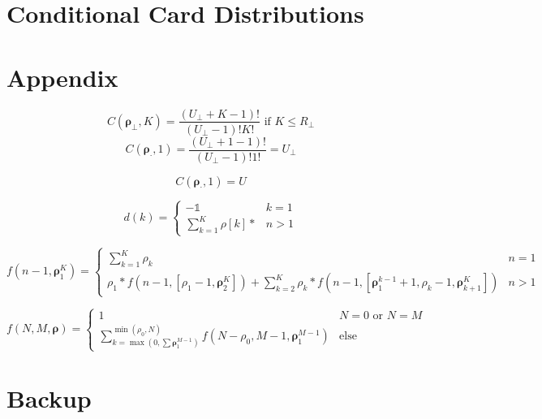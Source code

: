 \documentclass{article}
\begin{document}
\section{Conditional Card Distributions}

\pagebreak

\section{Appendix}

\begin{equation}
    C(\bm{\rho_{\bot}}, K) = \frac{(U_{\bot} + K - 1)!}{(U_{\bot} - 1)!K!} \text{ if } K \leq R_{\bot}
\end{equation}
\begin{equation}
    C(\bm{\rho_{\cdot}}, 1) = \frac{(U_{\bot} + 1 - 1)!}{(U_{\bot} - 1)!1!} = U_{\bot}
\end{equation}

\begin{equation}
    C(\bm{\rho_{\cdot}}, 1) = U
\end{equation}


\begin{equation}
    d(k) = \begin{cases} 
      -\mathds{1} & k=1 \\
      \sum_{k=1}^K \rho[k]* & n>1
   \end{cases}
\end{equation}

\begin{equation}
    f(n-1, \bm{\rho}_1^K) = \begin{cases} 
      \sum_{k=1}^K \rho_k & n=1 \\
      \rho_1*f(n - 1, [\rho_1 - 1, \bm{\rho}_2^K]) + \sum_{k=2}^K \rho_k*f(n - 1, [\bm{\rho}_1^{k-1} + 1, \rho_k - 1, \bm{\rho}_{k+1}^K]) & n>1
   \end{cases}
\end{equation}

\begin{equation}
    f(N, M, \bm{\rho}) = \begin{cases} 
      1 & N=0 \text{ or } N=M \\
      \sum_{k=\max (0, \sum \bm{\rho}_1^{M-1})}^{\min(\rho_0, N)}f(N - \rho_0, M - 1, \bm{\rho}_1^{M-1}) & \text{else}
   \end{cases}
\end{equation}
\section{Backup}
\end{document}
